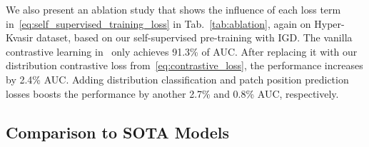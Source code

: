 \documentclass[runningheads]{llncs}
\begin{document}
We also present an ablation study that shows the influence of each loss term in~\eqref{eq:self_supervised_training_loss} in Tab.~\ref{tab:ablation}, again on Hyper-Kvasir dataset, based on our self-supervised pre-training with IGD. 
The vanilla contrastive learning in~\cite{simclr,moco} only achieves 91.3\% of AUC. After replacing it with our distribution contrastive loss from~\eqref{eq:contrastive_loss}, the performance increases by 2.4\% AUC. Adding distribution classification and patch position prediction losses boosts the performance by another 2.7\% and 0.8\% AUC, respectively.






















\subsection{Comparison to SOTA Models}
\end{document}
